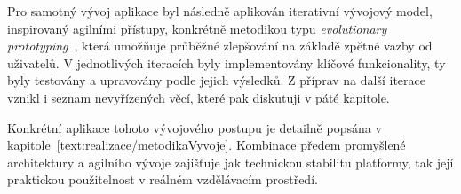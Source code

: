 Pro samotný vývoj aplikace byl následně aplikován iterativní vývojový model, inspirovaný agilními přístupy, konkrétně metodikou typu \textit{evolutionary prototyping}~\cite{somerville2015software}, která umožňuje průběžné zlepšování na základě zpětné vazby od uživatelů. 
V jednotlivých iteracích byly implementovány klíčové funkcionality, ty byly testovány a upravovány podle jejich výsledků.
Z příprav na další iterace vznikl i seznam nevyřízených věcí, které pak diskutuji v páté kapitole.

Konkrétní aplikace tohoto vývojového postupu je detailně popsána v kapitole~\ref{text:realizace/metodikaVyvoje}.
Kombinace předem promyšlené architektury a agilního vývoje zajišťuje jak technickou stabilitu platformy, tak její praktickou použitelnost v reálném vzdělávacím prostředí.








